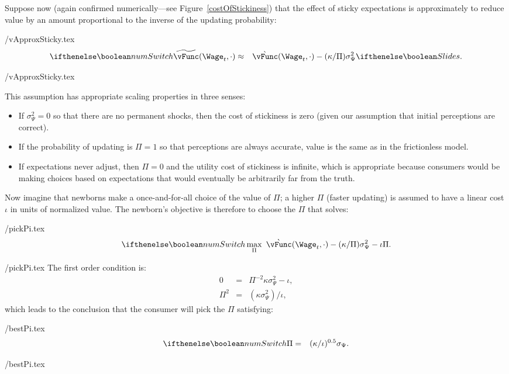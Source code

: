 \documentclass[titlepage]{\econtex}
\begin{document}
Suppose now (again confirmed numerically---see Figure~\ref{costOfStickiness}) that the effect of sticky expectations is approximately to reduce value by an amount proportional to the inverse of the updating probability:
\begin{verbatimwrite}{\eq/vApproxSticky.tex}
\begin{eqnarray}
  \label{eq:vBar}
\ifnumSw  \perc{\vFunc}(\Wage_t,\cdot) & \approx & \grave{\vFunc}(\Wage_t,\cdot)-(\kappa/\Pi)\sigma^{2}_{\Psi} \label{eq:vApproxSticky}
\ifslides{}{.}
\end{eqnarray}
\end{verbatimwrite}

 \eq/vApproxSticky.tex

This assumption has appropriate scaling properties in three senses:
\begin{itemize}
\item If $\sigma^{2}_{\Psi}=0$ so that there are no permanent shocks, then
the cost of stickiness is zero (given our assumption that initial perceptions are correct).
\item If the probability of updating is $\Pi=1$ so that perceptions
are always accurate, value is the same as in the frictionless model.
\item If expectations never adjust, then $\Pi=0$ and the utility cost of stickiness is infinite,
which is appropriate because consumers would be making choices based on
expectations that would eventually be arbitrarily far from the truth.
\end{itemize}

Now imagine that newborns make a once-and-for-all choice of the value of $\Pi$; a higher $\Pi$ (faster updating) is assumed to have a linear cost $\iota$ in units of normalized value. %
The newborn's objective is therefore to choose the $\Pi$ that solves:
\begin{verbatimwrite}{\eq/pickPi.tex}
\begin{eqnarray*}
\ifnumSw  \max_{\Pi} ~ \grave{\vFunc}(\Wage_t,\cdot)-(\kappa/\Pi)\sigma^{2}_{\Psi}-\iota\Pi. \label{eq:pickPi}
\end{eqnarray*}
\end{verbatimwrite}
 \eq/pickPi.tex
The first order condition is:
\begin{eqnarray*}
     0 & = & \Pi^{-2}\kappa\sigma^{2}_{\Psi}-\iota,
\\  \Pi^{2} & = & (\kappa \sigma^{2}_{\Psi})/\iota,
\end{eqnarray*}
which leads to the conclusion that the consumer will
pick the $\Pi$ satisfying:
\begin{verbatimwrite}{\eq/bestPi.tex}
\begin{eqnarray*}
\ifnumSw \Pi & = &  (\kappa/\iota)^{0.5} \sigma_{\Psi}. \label{eq:bestPi}
\end{eqnarray*}
\end{verbatimwrite}
 \eq/bestPi.tex
\end{document}
